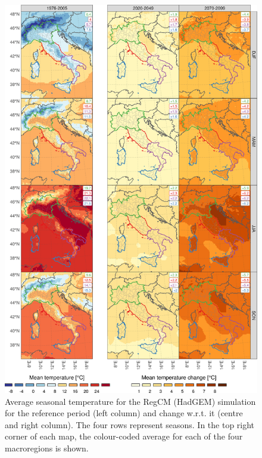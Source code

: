 \begin{figure}
    \centering
    \includegraphics[width=\textwidth]{figures/change_rcm/tas/mean_change_3col}
    \decoRule
    \caption[Future change of the average seasonal temperature]{
        Average seasonal temperature for the RegCM (HadGEM) simulation for the reference period (left column) and change w.r.t. it (centre and right column). The four rows represent seasons. In the top right corner of each map, the colour-coded average for each of the four macroregions is shown.
    } \label{fig:change_rcm_tas_mean}
\end{figure}

